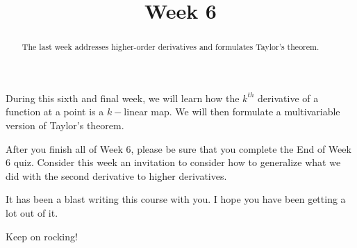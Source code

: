 \documentclass{ximera}
\title{Week 6}
\begin{document}
\begin{abstract}
  The last week addresses higher-order derivatives and formulates Taylor's theorem.
\end{abstract}

During this sixth and final week, we will learn how the $k^{th}$
derivative of a function at a point is a $k-$linear map.  We will then
formulate a multivariable version of Taylor's theorem.

After you finish all of Week 6, please be sure that you complete the
End of Week 6 quiz.  Consider this week an invitation to consider how
to generalize what we did with the second derivative to higher
derivatives.

It has been a blast writing this course with you.  I hope you have
been getting a lot out of it.

Keep on rocking!
\end{document}
